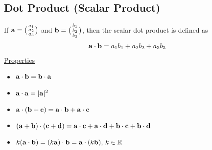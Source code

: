 \documentclass[10pt, a4paper, titlepage]{article}
\newcommand{\mbb}[1]{\mathbb{#1}}
\begin{document}
\begin{multicols*}{3}

	\dotfill
	\subsection{Dot Product (Scalar Product)}
	If $\vb{a}=\big(\begin{smallmatrix}a_1 \\a_2 \\a_3 \end{smallmatrix}\big)$
	and $\vb{b}=\big(\begin{smallmatrix}b_1 \\b_2 \\b_3 \end{smallmatrix}\big)$,
	then the scalar dot product is defined as
	\begin{align}
		\vb{a}\cdot\vb{b}=a_1b_1+a_2b_2+a_3b_3
	\end{align}
	\underline{Properties}
	\begin{itemize}
		\item $\vb{a}\cdot\vb{b} = \vb{b}\cdot\vb{a}$
		\item $\vb{a}\cdot\vb{a} = |\vb{a}|^2$
		\item $\vb{a}\cdot(\vb{b}+\vb{c})=\vb{a}\cdot\vb{b}+\vb{a}\cdot\vb{c}$
		\item $(\vb{a}+\vb{b})\cdot(\vb{c}+\vb{d})=\vb{a}\cdot\vb{c}+\vb{a}\cdot\vb{d}+\vb{b}\cdot\vb{c}+\vb{b}\cdot\vb{d}$
		\item $k(\vb{a}\cdot\vb{b})=(k\vb{a})\cdot\vb{b}=\vb{a}\cdot(k\vb{b}), \,k\in\mbb{R}$
	\end{itemize}


\end{multicols*}
\end{document}
